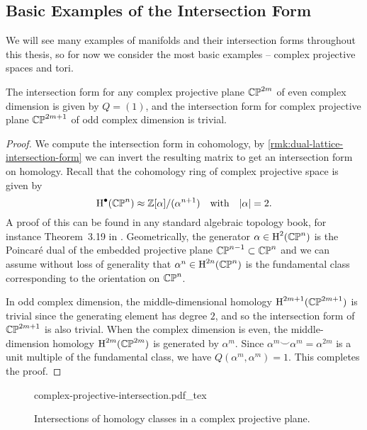 \subsection{Basic Examples of the Intersection Form}

We will see many examples of manifolds and their intersection forms throughout this thesis, so for now we consider the most basic examples -- complex projective spaces and tori.

\begin{proposition}\label{prop:intersection-form-complex-projective-plane}
	The intersection form for any complex projective plane $\mathbb{CP}^{2m}$ of even complex dimension is given by $Q=(1)$, and the intersection form for complex projective plane $\mathbb{CP}^{2m+1}$ of odd complex dimension is trivial.
\end{proposition}
\begin{proof}
	We compute the intersection form in cohomology, by \cref{rmk:dual-lattice-intersection-form} we can invert the resulting matrix to get an intersection form on homology.
	Recall that the cohomology ring of complex projective space is given by
	\[
		\operatorname{H}^\bullet(\mathbb{CP}^{n}) \approx \mathbb{Z}[\alpha]/(\alpha^{n+1})\quad\textrm{with}\quad |\alpha|=2.
	\]
	A proof of this can be found in any standard algebraic topology book, for instance Theorem~3.19 in \cite{hatcher2002topology}. 
	Geometrically, the generator $\alpha\in \operatorname{H}^2(\mathbb{CP}^n)$ is the Poincar\'e dual of the embedded projective plane $\mathbb{CP}^{n-1}\subset \mathbb{CP}^n$ and we can assume without loss of generality that $\alpha^n\in \operatorname{H}^{2n}(\mathbb{CP}^n)$ is the fundamental class corresponding to the orientation on $\mathbb{CP}^n$.

	In odd complex dimension, the middle-dimensional homology $\operatorname{H}^{2m+1}(\mathbb{CP}^{2m+1})$ is trivial since the generating element has degree $2$, and so the intersection form of $\mathbb{CP}^{2m+1}$ is also trivial.
	When the complex dimension is even, the middle-dimension homology $\operatorname{H}^{2m}(\mathbb{CP}^{2m})$ is generated by $\alpha^m$. Since $\alpha^m\smile \alpha^m=\alpha^{2m}$ is a unit multiple of the fundamental class, we have $Q(\alpha^m, \alpha^m)=1$. This completes the proof.
\end{proof}

\begin{figure}[ht]
	\centering
	{complex-projective-intersection.pdf_tex}
	\caption{Intersections of homology classes in a complex projective plane.}\label{fig:geometric-intersection-complex-projective}
\end{figure}

